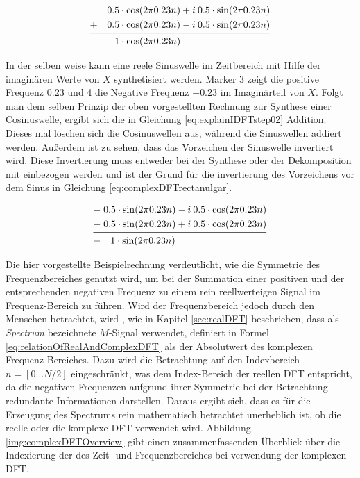 \begin{equation}
\begin{split}
0.5 \cdot \cos(2  \pi 0.23 n) + i \: 0.5 \cdot \sin(2  \pi 0.23 n) \\
+ \quad 0.5 \cdot \cos(2  \pi 0.23 n) - i \:  0.5 \cdot \sin(2  \pi 0.23 n) \\
\midrule
1 \cdot  \cos(2  \pi 0.23 n) \qquad \qquad \qquad \qquad \quad \;
\end{split}
\label{eq:explainIDFTstep01}
\end{equation}
 
 In der selben weise kann eine reele Sinuswelle im Zeitbereich mit Hilfe der imaginären Werte von $X$ synthetisiert werden. Marker 3 zeigt die positive Frequenz $0.23$ und 4 die Negative Frequenz $-0.23$ im Imaginärteil von $X$. Folgt man dem selben Prinzip der oben vorgestellten Rechnung zur Synthese einer Cosinuswelle, ergibt sich die in Gleichung \ref{eq:explainIDFTstep02} Addition. Dieses mal löschen sich die Cosinuswellen aus, während die Sinuswellen addiert werden. Außerdem ist zu sehen, dass das Vorzeichen der Sinuswelle invertiert wird.  Diese Invertierung muss entweder bei der Synthese oder der Dekomposition mit einbezogen werden und ist der Grund für die invertierung des Vorzeichens vor dem Sinus in Gleichung \ref{eq:complexDFTrectanulgar}. \cite[S. 574]{dspGuide} 
 
 \begin{equation}
 \begin{split}
-\; 0.5 \cdot \sin(2  \pi 0.23 n) - i \: 0.5 \cdot \cos(2  \pi 0.23 n) \\
-\; 0.5 \cdot \sin(2  \pi 0.23 n) + i \:  0.5 \cdot \cos(2  \pi 0.23 n) \\
\midrule
-\quad 1 \cdot  \sin (2  \pi 0.23 n) \qquad \qquad \qquad \qquad \quad \: \:
 \end{split}
 \label{eq:explainIDFTstep02}
 \end{equation}
 
Die hier vorgestellte Beispielrechnung verdeutlicht, wie die Symmetrie des Frequenzbereiches genutzt wird, um bei der Summation einer positiven und der entsprechenden negativen Frequenz zu einem rein reellwerteigen Signal im Frequenz-Bereich zu führen. Wird der Frequenzbereich jedoch durch den Menschen betrachtet, wird , wie in Kapitel \ref{sec:realDFT} beschrieben, dass als \emph{Spectrum} bezeichnete $M$-Signal verwendet, definiert in Formel \ref{eq:relationOfRealAndComplexDFT} als der Absolutwert des komplexen Frequenz-Bereiches. Dazu wird die Betrachtung auf den Indexbereich $n = [0 \ldots N/2]$ eingeschränkt, was dem Index-Bereich der reellen DFT entspricht, da die negativen Frequenzen aufgrund ihrer Symmetrie bei der Betrachtung redundante Informationen darstellen. Daraus ergibt sich, dass es für die Erzeugung des Spectrums rein mathematisch betrachtet unerheblich ist, ob die reelle oder die komplexe DFT verwendet wird. Abbildung \ref{img:complexDFTOverview} gibt einen zusammenfassenden Überblick über die Indexierung der des Zeit- und Frequenzbereiches bei verwendung der komplexen DFT. \cite[S. 225 - 226]{dspGuide}
 
